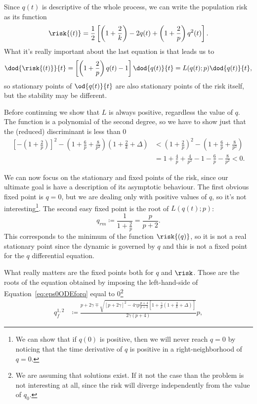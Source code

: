 Since \(q(t)\) is descriptive of the whole process, we can write the population risk as its function
\[
  \risk{(t)} = \frac12\left[\left(1+\frac2k\right)-2q{(t)}+\left(1+\frac2p\right)q^2{(t)}\right].
\]
What it's really important about the last equation is that leads us to
\[
    \dod{\risk{(t)}}{t} = \left[\left(1+\frac2p\right)q{(t)}-1\right] \dod{q{(t)}}{t} = L{(q{(t)};p)} \dod{q{(t)}}{t},
\]
so stationary points of \(\od{q{(t)}}{t}\) are also stationary points of the risk itself, but the stability may be different.

Before continuing we show that \(L\) is always positive, regardless the value of \(q\).
The function is a polynomial of the second degree,
so we have to show just that the (reduced) discriminant is less than 0
\[\begin{split}
  \left[-\left(1 + \frac2p \right)\right]^2 - \left(1+\frac6p+\frac{8}{p^2}\right)\left(1+\frac2k+\Delta\right) &<
  \left(1 + \frac2p \right)^2 - \left(1+\frac6p+\frac{8}{p^2}\right) \\
  &= 1 + \frac4p + \frac{4}{p^2} - 1-\frac6p-\frac{8}{p^2} 
  <0.
\end{split}\]

We can now focus on the stationary and fixed points of the risk,
since our ultimate goal is have a description of its asymptotic behaviour.
The first obvious fixed point is \(q=0\), but we are dealing only with positive values of \(q\),
so it's not interesting\footnote{
  We can show that if \(q{(0)}\) is positive, then we will never reach \(q=0\)
  by noticing that the time derivative of \(q\) is positive 
  in a right-neighborhood of \(q=0\).
}.
The second easy fixed point is the root of \(L{(q{(t)};p)}\):
\[q_{rm} \coloneqq \frac{1}{1+\frac2p} = \frac{p}{p+2}.\]
This corresponds to the minimum of the function \(\risk{(q)}\),
so it is not a real stationary point since the dynamic is governed by \(q\)
and this is not a fixed point for the \(q\) differential equation.

What really matters are the fixed points both for \(q\) and \(\risk\). 
Those are the roots of the equation obtained by imposing the left-hand-side 
of Equation~\eqref{eq:eps0ODEforq} equal to 0\footnote{
  We are assuming that solutions exist.
  If it not the case than the problem is not interesting at all,
  since the risk will diverge independently from the value of \(q_0\).
}
\begin{equation}\begin{split}
  \displaystyle
  q_f^{1,2} &\coloneqq 
    \frac{p+2\gamma \mp
                \sqrt{\left[p+2\gamma\right]^2-
                      4\gamma p\frac{p+4}{p+2}
                        \left[1+\frac{\gamma}{p}\left(1+\frac2k+\Delta\right)\right]}}
                  {2\gamma\left(p+4\right)}p,
\end{split}\end{equation}


